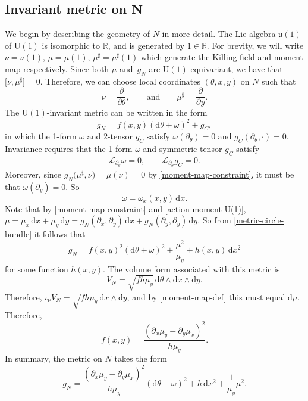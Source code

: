 \documentclass[10pt,a4paper]{amsart}
\newcommand{\uu}{\mathfrak{u}}
\newcommand{\U}{{\mathrm{U}}}
\newcommand{\R}{{\mathbb{R}}}
\newcommand{\1}{{\mathbb{1}}}
\newcommand{\bdy}{\partial}
\def \d{\mathrm{d}}
\numberwithin{equation}{section}
\begin{document}
\subsection[Invariant metric on N]{Invariant metric on $\boldsymbol{N}$}

We begin by describing the geometry of $N$ in more detail. The Lie algebra $\uu(1)$ of $\U(1)$ is isomorphic to $\R$, and is generated by $1\in\R$. For brevity, we will write $\nu=\nu(1)$, $\mu=\mu(1)$, $\mu^\sharp=\mu^\sharp(1)$ which generate the Killing field and moment map respectively. Since both $\mu$ and~$g_N$ are $\U(1)$-equivariant, we have that $\big[\nu,\mu^\sharp\big]=0$. Therefore, we can choose local coordinates $(\theta,x,y)$ on $N$ such that
\begin{equation}\label{action-moment-U(1)}
\nu = \frac{\partial}{\partial\theta},\qquad\text{and}\qquad \mu^\sharp=\frac{\partial}{\partial y}.
\end{equation}
The $\U(1)$-invariant metric can be written in the form
\begin{equation}\label{metric-circle-bundle}
g_N = f(x,y)(\d\theta+\omega)^2 + g_C,
\end{equation}
in which the 1-form $\omega$ and 2-tensor $g_C$ satisfy $\omega(\partial_\theta)=0$ and $g_C(\partial_\theta,\cdot)=0$. Invariance requires that the 1-form $\omega$ and symmetric tensor $g_C$ satisfy
\begin{align*}
 \mathcal{L}_{\partial_\theta}\omega=0,\qquad \mathcal{L}_{\partial_\theta}g_C=0.
\end{align*}
Moreover, since $g_N\big(\mu^\sharp,\nu\big)=\mu(\nu)=0$ by \eqref{moment-map-constraint}, it must be that $\omega(\partial_y)=0$. So
\begin{equation*}
\omega=\omega_x(x,y)\,\d x.
\end{equation*}
Note that by \eqref{moment-map-constraint} and \eqref{action-moment-U(1)}, $\mu=\mu_x\,\d x+\mu_y\,\d y=g_N(\bdy_x,\bdy_y)\,\d x+g_N(\bdy_y,\bdy_y)\,\d y$. So from \eqref{metric-circle-bundle} it follows that
\begin{equation*}
g_N = f(x,y)^2(\d\theta+\omega)^2 + \frac{\mu^2}{\mu_y} + h(x,y)\,\d x^2
\end{equation*}
for some function $h(x,y)$. The volume form associated with this metric is
\begin{equation*}
V_N = \sqrt{fh\mu_y}\,\d\theta\wedge\d x \wedge \d y.
\end{equation*}
Therefore, $\iota_\nu V_N = \sqrt{fh\mu_y}\, \d x \wedge \d y$, and by \eqref{moment-map-def} this must equal $\d\mu$. Therefore,
\begin{equation*}
f(x,y) = \frac{(\partial_x\mu_y-\partial_y\mu_x)^2}{h\mu_y}.
\end{equation*}
In summary, the metric on $N$ takes the form
\begin{equation}\label{metric-fixed-U(1)}
g_N = \frac{(\partial_x\mu_y-\partial_y\mu_x)^2}{h\mu_y}(\d\theta+\omega)^2 + h\,\d x^2 + \frac{1}{\mu_y}\mu^2.
\end{equation}
\end{document}
